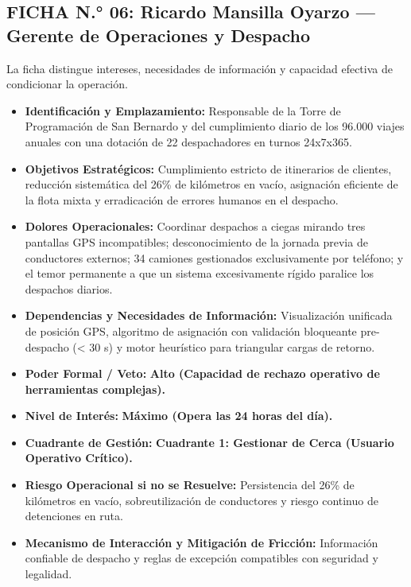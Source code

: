 \subsection*{FICHA N.° 06: Ricardo Mansilla Oyarzo — Gerente de Operaciones y Despacho}
La ficha distingue intereses, necesidades de información y capacidad efectiva de condicionar la operación.
\begin{itemize}
\item \textbf{Identificación y Emplazamiento:} Responsable de la Torre de Programación de San Bernardo y del cumplimiento diario de los 96.000 viajes anuales con una dotación de 22 despachadores en turnos 24x7x365.
\item \textbf{Objetivos Estratégicos:} Cumplimiento estricto de itinerarios de clientes, reducción sistemática del 26\% de kilómetros en vacío, asignación eficiente de la flota mixta y erradicación de errores humanos en el despacho.
\item \textbf{Dolores Operacionales:} Coordinar despachos a ciegas mirando tres pantallas GPS incompatibles; desconocimiento de la jornada previa de conductores externos; 34 camiones gestionados exclusivamente por teléfono; y el temor permanente a que un sistema excesivamente rígido paralice los despachos diarios.
\item \textbf{Dependencias y Necesidades de Información:} Visualización unificada de posición GPS, algoritmo de asignación con validación bloqueante pre-despacho (< 30 s) y motor heurístico para triangular cargas de retorno.
\item \textbf{Poder Formal / Veto:} \textbf{Alto (Capacidad de rechazo operativo de herramientas complejas).}
\item \textbf{Nivel de Interés:} \textbf{Máximo (Opera las 24 horas del día).}
\item \textbf{Cuadrante de Gestión:} \textbf{Cuadrante 1: Gestionar de Cerca (Usuario Operativo Crítico).}
\item \textbf{Riesgo Operacional si no se Resuelve:} Persistencia del 26\% de kilómetros en vacío, sobreutilización de conductores y riesgo continuo de detenciones en ruta.
\item \textbf{Mecanismo de Interacción y Mitigación de Fricción:} Información confiable de despacho y reglas de excepción compatibles con seguridad y legalidad.
\end{itemize}
